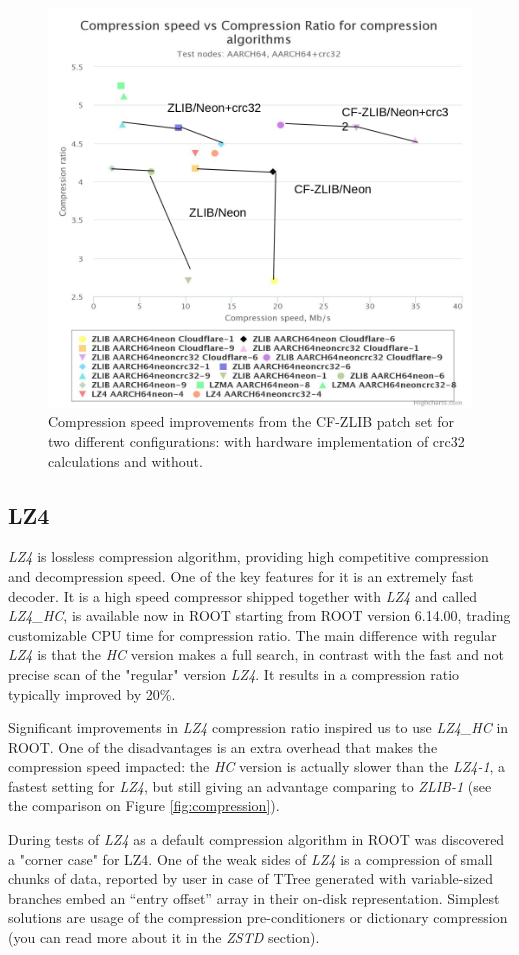 \documentclass[12pt]{iopart}
\begin{document}
\begin{figure}[!ht]
\centering
\includegraphics[width=0.7\linewidth]{acat31.png}
\caption{Compression speed improvements from the CF-ZLIB patch set for two different configurations: with hardware implementation of crc32 calculations and without.}
\label{fig:cfneon}
\end{figure}

\subsection{LZ4}

\textit{LZ4} is lossless compression algorithm, providing high competitive compression and decompression speed. One of the key features for it is an extremely fast decoder. It is a high speed compressor shipped together with \textit{LZ4} and called \textit{LZ4\_HC}, is available now in ROOT starting from ROOT version 6.14.00, trading customizable CPU time for compression ratio. The main difference with regular \textit{LZ4} is that the \textit{HC} version makes a full search, in contrast with the fast and not precise scan of the "regular" version \textit{LZ4}. It results in a compression ratio typically improved by 20\%. 

Significant improvements in \textit{LZ4} compression ratio inspired us to use \textit{LZ4\_HC} in ROOT. One of the disadvantages is an extra overhead that makes the compression speed impacted: the \textit{HC} version is actually slower than the \textit{LZ4-1}, a fastest setting for \textit{LZ4}, but still giving an advantage comparing to \textit{ZLIB-1} (see the comparison on Figure \ref{fig:compression}).

During tests of \textit{LZ4} as a default compression algorithm in ROOT was discovered a "corner case" for LZ4. One of the weak sides of \textit{LZ4} is a compression of small chunks of data, reported by user in case of TTree generated with variable-sized branches embed an “entry offset” array in their on-disk representation. Simplest solutions are usage of the compression pre-conditioners or dictionary compression (you can read more about it in the \textit{ZSTD} section). 
\end{document}
